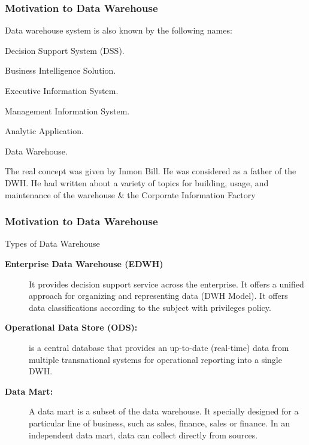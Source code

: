 \begin{frame}
\frametitle{Motivation to Data Warehouse}

Data warehouse system is also known by the following names:


\begin{wideitemize}
\item Decision Support System (DSS).
\item Business Intelligence Solution.
\item Executive Information System.
\item Management Information System.
\item Analytic Application.
\item Data Warehouse.

\end{wideitemize}

The real concept was given by Inmon Bill. He was considered as a father of the DWH. He had written about a variety of topics for building, usage, and maintenance of the warehouse \& the Corporate Information Factory

\end{frame}

\begin{frame}
\frametitle{Motivation to Data Warehouse}
Types of Data Warehouse
\begin{description}
\item [\textbf{Enterprise Data Warehouse (EDWH)}] It provides decision support service across the enterprise. It offers a unified approach for organizing and representing data (DWH Model). It offers data classifications according to the subject with privileges policy.
\item [\textbf{Operational Data Store (ODS):}] is a central database that provides an up-to-date (real-time) data from multiple transnational systems for operational reporting into a single DWH.

\item [\textbf{Data Mart:}] A data mart is a subset of the data warehouse. It specially designed for a particular line of business, such as sales, finance, sales or finance. In an independent data mart, data can collect directly from sources.
\end{description}

\end{frame}

